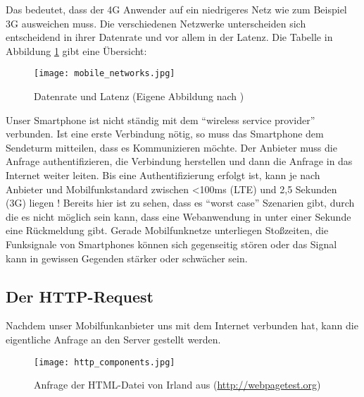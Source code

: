 			Das bedeutet, dass der 4G Anwender auf ein niedrigeres Netz wie zum Beispiel 3G ausweichen muss. Die verschiedenen Netzwerke unterscheiden sich entscheidend in ihrer Datenrate und vor allem in der Latenz. Die Tabelle in Abbildung \ref{fig:mobile_networks} gibt eine Übersicht:

			\begin{figure}[htbp]
				\begin{center}
					\texttt{[image: mobile\_networks.jpg]}
					\caption{Datenrate und Latenz (Eigene Abbildung nach \autocite{grigorikGNetwork})}
					\label{fig:mobile_networks}
				\end{center}
			\end{figure}

			Unser Smartphone ist nicht ständig mit dem "`wireless service provider"' verbunden. Ist eine erste Verbindung nötig, so muss das Smartphone dem Sendeturm mitteilen, dass es Kommunizieren möchte. Der Anbieter muss die Anfrage authentifizieren, die Verbindung herstellen und dann die Anfrage in das Internet weiter leiten. Bis eine Authentifizierung erfolgt ist, kann je nach Anbieter und Mobilfunkstandard zwischen <100ms (LTE) und 2,5 Sekunden (3G) liegen \autocite{grigorikRadio}! Bereits hier ist zu sehen, dass es "`worst case"' Szenarien gibt, durch die es nicht möglich sein kann, dass eine Webanwendung in unter einer Sekunde eine Rückmeldung gibt. Gerade Mobilfunknetze unterliegen Stoßzeiten, die Funksignale von Smartphones können sich gegenseitig stören oder das Signal kann in gewissen Gegenden stärker oder schwächer sein.



		\subsection{Der HTTP-Request} %
		\label{sub:der_http_request_komponente}
			Nachdem unser Mobilfunkanbieter uns mit dem Internet verbunden hat, kann die eigentliche Anfrage an den Server gestellt werden.

			\begin{figure}[htbp]
				\begin{center}
					\texttt{[image: http\_components.jpg]}
					\caption{Anfrage der HTML-Datei von Irland aus (\url{http://webpagetest.org})}
					\label{fig:http_components}
				\end{center}
			\end{figure}


